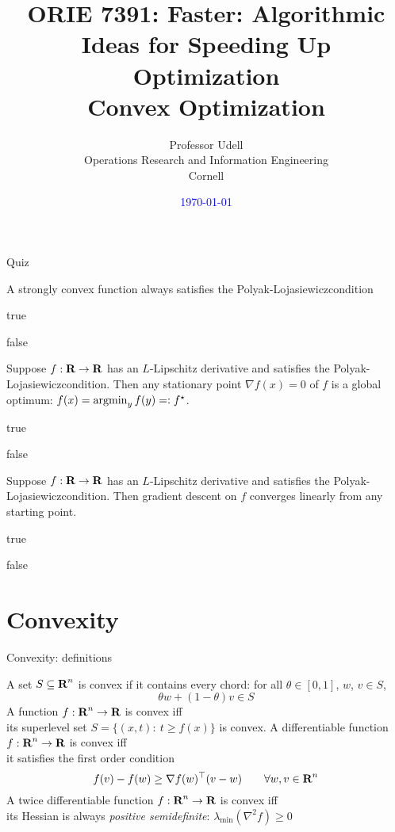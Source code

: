 \documentclass[presentation,xcolor={usenames,dvipsnames}]{beamer}
\title{ORIE 7391: Faster: Algorithmic Ideas for Speeding Up Optimization\\[2ex]
       Convex Optimization}
\date{\textcolor{blue}{\today}}
\author{Professor Udell \\[1ex]
Operations Research and Information Engineering \\
Cornell}
\newcommand{\pl}{Polyak-Lojasiewicz}
\begin{document}
\begin{frame}
\titlepage
\end{frame}

\begin{frame}{Quiz}

\bit
\item A strongly convex function always satisfies the \pl condition
\ben[A.]
\item true
\item false
\een
\item Suppose $f: {\mbox{\bf R}} \to {\mbox{\bf R}}$ has an $L$-Lipschitz derivative and satisfies the \pl condition. Then any stationary point $\nabla f(x) = 0$ of $f$ is a global optimum: $f(x) = \mathop{\rm argmin}_y f(y) =: f^\star$.
\ben[A.]
\item true
\item false
\een
\item Suppose $f: {\mbox{\bf R}} \to {\mbox{\bf R}}$ has an $L$-Lipschitz derivative and satisfies the \pl condition. Then gradient descent on $f$ converges linearly from any starting point.
\ben[A.]
\item true
\item false
\een
\eit

\end{frame}

\section{Convexity}

\begin{frame}{Convexity: definitions}

\bit
\pitem A set $S \subseteq {\mbox{\bf R}}^n$ is convex if it contains every chord:
for all $\theta \in [0,1]$, $w$, $v \in S$,
\[
\theta w + (1-\theta)v \in S
\]
\pitem A function $f: {\mbox{\bf R}}^n \to {\mbox{\bf R}}$ is convex iff \\
its superlevel set
$S = \{(x, t):~t \geq f(x)\}$ is convex.
\pitem A differentiable function $f: {\mbox{\bf R}}^n \to {\mbox{\bf R}}$ is convex iff \\ it satisfies the first order condition
\[
f(v) - f(w) \geq \nabla f(w)^\top (v-w) \qquad \forall w, v \in {\mbox{\bf R}}^n
\]
\pitem A twice differentiable function $f: {\mbox{\bf R}}^n \to {\mbox{\bf R}}$ is convex iff \\
its Hessian is always \emph{positive semidefinite}: $\lambda_\text{min}(\nabla^2 f) \geq 0$
\eit
\end{frame}
\end{document}
